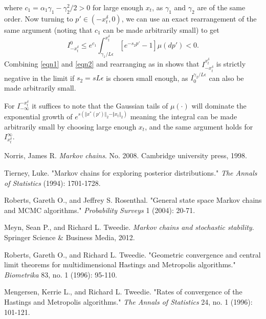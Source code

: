 \documentclass{article}
\begin{document}
where $c_{1}=\alpha_{1}\gamma_{1}-\gamma_{2}^{2}/2>0$ for large enough
$x_{t}$, as $\gamma_{1}$ and $\gamma_{2}$ are of the same order.
Now turning to $p'\in(-x_{t}^{\delta},0)$, we can use an exact rearrangement
of the same argument (noting that $c_{1}$ can be made arbitrarily
small) to get 
\begin{equation}
I_{-x_{t}^{\delta}}^{0}\leq e^{c_{1}}\int_{\gamma_{1}/L\epsilon}^{x_{t}^{\delta}}[e^{-s_{2}p'}-1]\mu(dp')<0.\label{eqn2}
\end{equation}
Combining \eqref{eqn1} and \eqref{eqn2} and rearranging as in \cite[Theorem 3.2]{mengersen1996rates}
shows that $I_{-x_{t}^{\delta}}^{x_{t}^{\delta}}$ is strictly negative
in the limit if $s_{2}=sL\epsilon$ is chosen small enough, as $I_{0}^{\gamma_{2}/L\epsilon}$
can also be made arbitrarily small.

For $I_{-\infty}^{-x_{t}^{\delta}}$ it suffices to note that the
Gaussian tails of $\mu(\cdot)$ will dominate the exponential growth
of $e^{s(\Vert x^{*}(p')\Vert_{2}-\Vert x_{t}\Vert_{2})}$ meaning
the integral can be made arbitrarily small by choosing large enough
$x_{t}$, and the same argument holds for $I_{x_{t}^{\delta}}^{\infty}$.

\begin{thebibliography}{1}

   Norris, James R. \emph{Markov chains}. No. 2008. Cambridge university press, 1998.

    Tierney, Luke. "Markov chains for exploring posterior distributions." \emph{The Annals of Statistics} (1994): 1701-1728.

   Roberts, Gareth O., and Jeffrey S. Rosenthal. "General state space Markov chains and MCMC algorithms." \emph{Probability Surveys} 1 (2004): 20-71.

   Meyn, Sean P., and Richard L. Tweedie. \emph{Markov chains and stochastic stability}. Springer Science \& Business Media, 2012.
  
   Roberts, Gareth O., and Richard L. Tweedie. "Geometric convergence and central limit theorems for multidimensional Hastings and Metropolis algorithms." \emph{Biometrika} 83, no. 1 (1996): 95-110.
  
   Mengersen, Kerrie L., and Richard L. Tweedie. "Rates of convergence of the Hastings and Metropolis algorithms." \emph{The Annals of Statistics} 24, no. 1 (1996): 101-121.

  \end{thebibliography}
\end{document}
